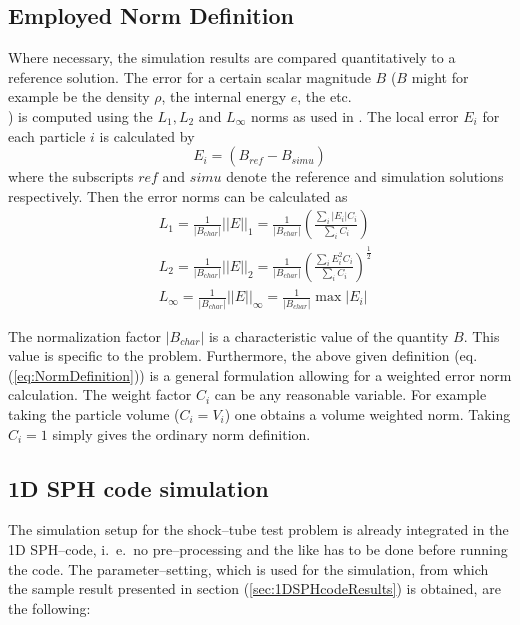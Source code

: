\documentclass[11pt,a4paper,twoside]{report}
\newcommand{\norm}[1]{\left|#1\right|}
\newcommand{\nnorm}[1]{\left|\left|#1\right|\right|}
\begin{document}
\subsection{Employed Norm Definition}
\label{sec:employedNormDefinition}
Where necessary, the simulation results are compared quantitatively to a reference solution. The error for a certain scalar magnitude $B$ ($B$ might for example be the density $\rho$, the internal energy $e$, the  etc.\\) is computed using the $L_1,L_2$ and $L_\infty$ norms as used in \cite{Novak2007}. 
The local error $E_i$ for each particle $i$ is calculated by 
\begin{equation}
 E_i=(B_{\mathit{ref}}-B_{\mathit{simu}})
\end{equation}
where the subscripts $ref$ and $simu$ denote the reference and simulation solutions respectively.
Then the error norms can be calculated as
\begin{equation}
\label{eq:NormDefinition}
\begin{split}
 & L_1=\frac{1}{\norm{B_{\mathit{char}}}}\nnorm{E}_1=\frac{1}{\norm{B_{\mathit{char}}}}\left(\frac{\sum_i \norm{E_i} C_i }{\sum_i C_i}\right)\\[0.3cm]
& L_2=\frac{1}{\norm{B_{\mathit{char}}}}\nnorm{E}_2=\frac{1}{\norm{B_{\mathit{char}}}}\left(\frac{\sum_i E^2_i C_i }{\sum_i C_i}\right)^{\frac{1}{2}}\\[0.3cm]
& L_\infty=\frac{1}{\norm{B_{\mathit{char}}}}\nnorm{E}_\infty=\frac{1}{\norm{B_{\mathit{char}}}}\max \norm{E_i}
\end{split}
\end{equation}

The normalization factor $\norm{B_{\mathit{char}}}$ is  a characteristic value of the quantity $B$. This value is specific to the problem. Furthermore, the above given definition (eq. (\ref{eq:NormDefinition})) is a general formulation allowing for a weighted error norm calculation. The weight factor $C_i$ can be any reasonable variable. For example taking the particle volume ($C_i=V_i$) one obtains a volume weighted norm. Taking $C_i=1$ simply gives the ordinary norm definition.


\subsection{1D SPH code simulation}
\label{sec:simuSetup1DSPHcode}
The simulation setup for the shock--tube test problem is already integrated in the 1D SPH--code, i.\ e.\ no pre--processing and the like has to be done before running the code. 
The parameter--setting, which is used for the simulation, from which the sample result presented in section (\ref{sec:1DSPHcodeResults}) is obtained, are the following:
\end{document}
